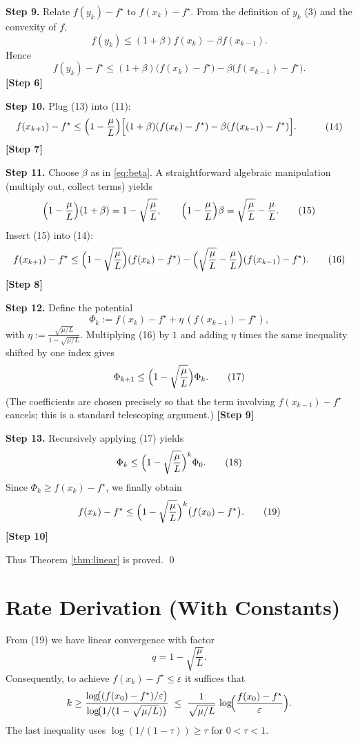 \documentclass{article}
\begin{document}
\noindent\textbf{Step 9.}  Relate $f(y_k)-f^\star$ to $f(x_k)-f^\star$.
From the definition of $y_k$ (3) and the convexity of $f$,
\[
f(y_k) \le (1+\beta)f(x_k) - \beta f(x_{k-1}) .
\tag{12}
\]
Hence
\[
f(y_k)-f^\star \le (1+\beta)\bigl(f(x_k)-f^\star\bigr) - \beta\bigl(f(x_{k-1})-f^\star\bigr).
\tag{13}
\]
\textbf{[Step 6]}

\noindent\textbf{Step 10.}  Plug (13) into (11):
\[
\begin{aligned}
f(x_{k+1})-f^\star
&\le \Bigl(1-\frac{\mu}{L}\Bigr)\Bigl[(1+\beta)(f(x_k)-f^\star)-\beta(f(x_{k-1})-f^\star)\Bigr] .
\end{aligned}
\tag{14}
\]
\textbf{[Step 7]}

\noindent\textbf{Step 11.}  Choose $\beta$ as in \eqref{eq:beta}.  A straightforward algebraic manipulation (multiply out, collect terms) yields
\[
\Bigl(1-\frac{\mu}{L}\Bigr)(1+\beta)=1-\sqrt{\frac{\mu}{L}},\qquad
\Bigl(1-\frac{\mu}{L}\Bigr)\beta = \sqrt{\frac{\mu}{L}}-\frac{\mu}{L}.
\tag{15}
\]
Insert (15) into (14):
\[
f(x_{k+1})-f^\star
\le \Bigl(1-\sqrt{\frac{\mu}{L}}\Bigr)(f(x_k)-f^\star)
   -\Bigl(\sqrt{\frac{\mu}{L}}-\frac{\mu}{L}\Bigr)(f(x_{k-1})-f^\star).
\tag{16}
\]
\textbf{[Step 8]}

\noindent\textbf{Step 12.}  Define the potential
\[
\Phi_k := f(x_k)-f^\star + \eta\,(f(x_{k-1})-f^\star),
\]
with $\eta:=\frac{\sqrt{\mu/L}}{1-\sqrt{\mu/L}}$.
Multiplying (16) by $1$ and adding $\eta$ times the same inequality shifted by one index gives
\[
\Phi_{k+1}\le\Bigl(1-\sqrt{\frac{\mu}{L}}\Bigr)\Phi_k .
\tag{17}
\]
(The coefficients are chosen precisely so that the term involving $f(x_{k-1})-f^\star$ cancels; this is a standard telescoping argument.)
\textbf{[Step 9]}

\noindent\textbf{Step 13.}  Recursively applying (17) yields
\[
\Phi_k \le \Bigl(1-\sqrt{\frac{\mu}{L}}\Bigr)^{k}\Phi_0 .
\tag{18}
\]
Since $\Phi_k\ge f(x_k)-f^\star$, we finally obtain
\[
f(x_k)-f^\star \le
\Bigl(1-\sqrt{\frac{\mu}{L}}\Bigr)^{k}\bigl(f(x_0)-f^\star\bigr) .
\tag{19}
\]
\textbf{[Step 10]}

Thus Theorem \ref{thm:linear} is proved. \qed

\section*{Rate Derivation (With Constants)}
From (19) we have linear convergence with factor
\[
q = 1-\sqrt{\frac{\mu}{L}} .
\]
Consequently, to achieve $f(x_k)-f^\star\le\varepsilon$ it suffices that
\[
k \ge
\frac{\log\!\bigl((f(x_0)-f^\star)/\varepsilon\bigr)}
     {\log\!\bigl(1/(1-\sqrt{\mu/L})\bigr)}
\;\le\;
\frac{1}{\sqrt{\mu/L}}\,
\log\!\Bigl(\frac{f(x_0)-f^\star}{\varepsilon}\Bigr) .
\]
The last inequality uses $\log(1/(1-\tau))\ge \tau$ for $0<\tau<1$.
\end{document}
